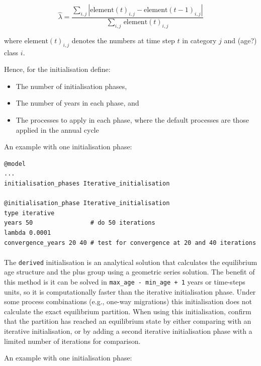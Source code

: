 \begin{equation}
  \widehat{\lambda} = \frac{\sum\limits_{i,j}  \left|\text{element}(t)_{i,j} - \text{element}(t-1)_{i,j} \right|}{\sum\limits_{i,j} \frac{}{}\text{element}(t)_{i,j}}
\end{equation}

where $\text{element}(t)_{i,j}$ denotes the numbers at time step $t$ in category $j$ and (age?) class $i$.

Hence, for the initialisation define:

\begin{itemize}
  \item The number of initialisation phases,
  \item The number of years in each phase, and
  \item The processes to apply in each phase, where the default processes are those applied in the annual cycle
\end{itemize}

An example with one initialisation phase:

{\small{\begin{verbatim}
@model
...
initialisation_phases Iterative_initialisation

@initialisation_phase Iterative_initialisation
type iterative
years 50                # do 50 iterations
lambda 0.0001
convergence_years 20 40 # test for convergence at 20 and 40 iterations
\end{verbatim}}}

\paragraph{}

The \texttt{derived} initialisation is an analytical solution that calculates the equilibrium age structure and the plus group using a geometric series solution. The benefit of this method is it can be solved in \texttt{max\_age - min\_age + 1} years or time-steps units, so it is computationally faster than the iterative initialisation phase. Under some process combinations (e.g., one-way migrations) this initialisation does not calculate the exact equilibrium partition. When using this initialisation, confirm that the partition has reached an equilibrium state by either comparing with an iterative initialisation, or by adding a second iterative initialisation phase with a limited number of iterations for comparison.

An example with one initialisation phase:

